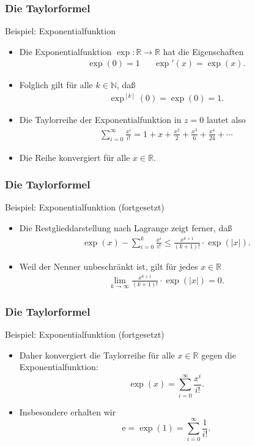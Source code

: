 \documentclass{beamer}
\newcommand\eul{\mathrm e}
\newcommand\NN{\mathbb N}
\newcommand\RR{\mathbb R}
\renewcommand{\ae}{\"a}
\newcommand{\ue}{\"u}
\newcommand{\mytitle}{Die Taylorformel}
\begin{document}
\begin{frame}\frametitle{\mytitle}
	\begin{block}{Beispiel: Exponentialfunktion}
	\begin{itemize}
		\item Die Exponentialfunktion $\exp:\RR\to\RR$ hat die Eigenschaften
			\begin{align*}
				\exp(0)=1&&\exp'(x)=\exp(x).
			\end{align*}
		\item Folglich gilt f\ue r alle $k\in\NN$, da\ss
			\begin{align*}
				\exp^{[k]}(0)=\exp(0)=1.
			\end{align*}
		\item Die Taylorreihe der Exponentialfunktion in $z=0$ lautet also
			\begin{align*}
				\sum_{i=0}^\infty\frac{x^i}{i!}=1+x+\frac{x^2}{2}+\frac{x^3}{6}+\frac{x^4}{24}+\cdots
			\end{align*}
		\item Die Reihe konvergiert f\ue r alle $x\in\RR$.
	\end{itemize}
	\end{block}
\end{frame}

\begin{frame}\frametitle{\mytitle}
	\begin{block}{Beispiel: Exponentialfunktion (fortgesetzt)}
	\begin{itemize}
		\item Die Restglieddarstellung nach Lagrange zeigt ferner, da\ss
			\begin{align*}
				\exp(x)-\sum_{i=0}^k\frac{x^i}{i!}\leq\frac{x^{k+1}}{(k+1)!}\cdot\exp(|x|).
			\end{align*}
		\item Weil der Nenner unbeschr\ae nkt ist, gilt f\ue r jedes $x\in\RR$
			\begin{align*}
				\lim_{k\to\infty}\frac{x^{k+1}}{(k+1)!}\cdot\exp(|x|)=0.
			\end{align*}
	\end{itemize}
	\end{block}
\end{frame}

\begin{frame}\frametitle{\mytitle}
	\begin{block}{Beispiel: Exponentialfunktion (fortgesetzt)}
	\begin{itemize}
		\item Daher konvergiert die Taylorreihe f\ue r alle $x\in\RR$ gegen die Exponentialfunktion:
			$$ \exp(x)=\sum_{i=0}^\infty\frac{x^i}{i!} .$$
		\item Insbesondere erhalten wir $$\eul=\exp(1)=\sum_{i=0}^\infty\frac{1}{i!}.$$
	\end{itemize}
	\end{block}
\end{frame}
\end{document}
